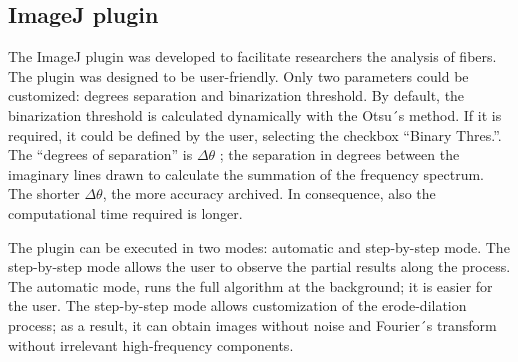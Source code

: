 \documentclass[12pt,a4paper]{article}
\begin{document}
\subsection{ImageJ plugin}

The ImageJ plugin was developed to facilitate researchers the analysis of fibers. The plugin was designed to be user-friendly. Only two parameters could be customized: degrees separation and binarization threshold. By default, the binarization threshold is calculated dynamically with the Otsu´s method. If it is required, it could be defined by the user, selecting the checkbox “Binary Thres.”. The “degrees of separation” is $\Delta\theta$ ; the separation in degrees between the imaginary lines drawn to calculate the summation of  the frequency spectrum. The shorter $\Delta\theta$, the more accuracy archived.  In consequence, also the computational time required is longer.

The plugin can be executed in two modes: automatic and step-by-step mode. The step-by-step mode allows the user to observe the partial results along the process. The automatic mode, runs the full algorithm at the background; it is easier for the user. The step-by-step mode allows customization of the erode-dilation process; as a result, it can obtain images without noise and Fourier´s transform without irrelevant high-frequency components. 
\end{document}
